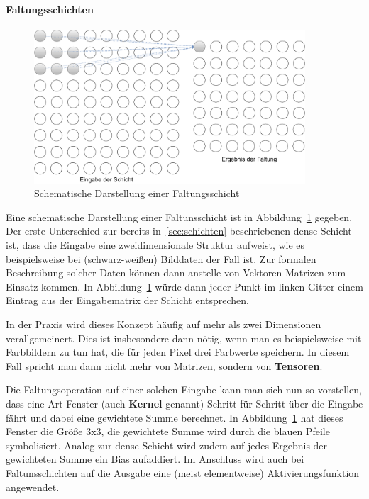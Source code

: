 \paragraph{Faltungsschichten}

\begin{figure}
    \centering
    \includegraphics[width=0.9\textwidth]{abbildungen/faltungsschicht}
    \caption{Schematische Darstellung einer Faltungsschicht}
    \label{fig:faltungsschicht}
\end{figure}

Eine schematische Darstellung einer Faltunsschicht ist in
Abbildung~\ref{fig:faltungsschicht} gegeben.
Der erste Unterschied zur bereits in~\ref{sec:schichten} beschriebenen
dense Schicht ist, dass die Eingabe eine zweidimensionale Struktur
aufweist, wie es beispielsweise bei (schwarz-wei{\ss}en) Bilddaten der Fall ist.
Zur formalen Beschreibung solcher Daten k\"onnen dann anstelle
von Vektoren Matrizen zum Einsatz kommen. In Abbildung~\ref{fig:faltungsschicht}
w\"urde dann jeder Punkt im linken Gitter einem Eintrag aus der Eingabematrix der
Schicht entsprechen.

In der Praxis wird dieses Konzept h\"aufig auf
mehr als zwei Dimensionen verallgemeinert. Dies ist insbesondere
dann n\"otig, wenn man es beispielsweise mit Farbbildern zu tun hat,
die f\"ur jeden Pixel drei Farbwerte speichern. In diesem Fall spricht man
dann nicht mehr von Matrizen, sondern von \textbf{Tensoren}.

Die Faltungsoperation auf einer solchen Eingabe kann man sich nun so
vorstellen, dass eine Art Fenster (auch \textbf{Kernel} genannt)
Schritt f\"ur Schritt \"uber die Eingabe f\"ahrt und dabei eine gewichtete
Summe berechnet. In Abbildung~\ref{fig:faltungsschicht} hat dieses Fenster
die Gr\"o{\ss}e 3x3, die gewichtete Summe wird durch die blauen Pfeile
symbolisiert. Analog zur dense Schicht wird zudem auf jedes Ergebnis
der gewichteten Summe ein Bias aufaddiert. Im Anschluss wird auch bei
Faltunsschichten auf die Ausgabe eine (meist elementweise)
Aktivierungsfunktion angewendet.

